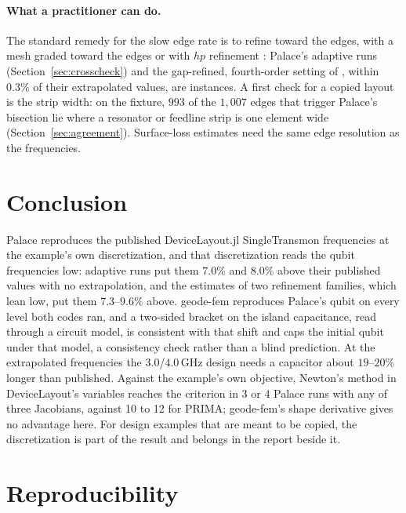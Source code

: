 \documentclass{anvil-paper}
\begin{document}
\paragraph{What a practitioner can do.}
The standard remedy for the slow edge rate is to refine toward the edges,
with a mesh graded toward the edges or with $hp$ refinement
\citep{demkowicz2006computing}: Palace's adaptive runs
(Section~\ref{sec:crosscheck}) and the gap-refined, fourth-order setting of
\citet{ye2025electromagnetic}, within $0.3\%$ of their extrapolated
values, are instances.
A first check for a copied layout is the strip width: on the fixture, $993$ of the $1{,}007$
edges that trigger Palace's bisection lie where a resonator or feedline
strip is one element wide (Section~\ref{sec:agreement}). Surface-loss estimates \citep{wang2015surface,martinis2022surface} need
the same edge resolution as the frequencies.

\section{Conclusion}
\label{sec:conclusion}

Palace reproduces the published DeviceLayout.jl SingleTransmon
frequencies at the example's own discretization, and that discretization
reads the qubit frequencies low: adaptive runs put them $7.0\%$ and $8.0\%$
above their published values with no extrapolation, and the estimates of
two refinement families, which lean low, put them $7.3$--$9.6\%$ above. geode-fem
reproduces Palace's qubit on every level both codes ran, and a two-sided
bracket on the island capacitance, read through a circuit model, is
consistent with that shift and caps the initial qubit under that model,
a consistency check rather than a blind prediction. At
the extrapolated frequencies the $3.0$/$4.0$\,GHz design needs a capacitor
about $19$--$20\%$ longer than published. Against the example's own objective, Newton's method in DeviceLayout's
variables reaches the criterion in 3 or 4 Palace runs with any of three
Jacobians, against 10 to 12 for PRIMA; geode-fem's shape derivative gives
no advantage here. For design examples that are meant to be
copied, the discretization is part of the result and belongs in the report
beside it.

\section{Reproducibility}
\label{sec:repro}
\end{document}
